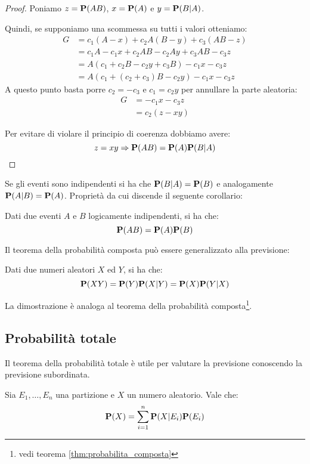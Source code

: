 \begin{proof}
  Poniamo \( z = \mathbf{P}(AB) \), \( x = \mathbf{P}(A) \) e \( y = \mathbf{P}(B|A) \).
  
  Quindi, se supponiamo una scommessa su tutti i valori otteniamo:
  \begin{align*}
    G &= c_1 (A - x) + c_2 A (B - y) + c_3 (AB - z) \\
    &= c_1A - c_1 x + c_2 AB - c_2 Ay + c_3 AB - c_3 z \\
    &= A(c_1 + c_2 B - c_2 y + c_3 B) - c_1 x - c_3 z \\
    &= A(c_1 + (c_2 + c_3)B - c_2 y) - c_1 x - c_3 z
  \end{align*}
  A questo punto basta porre \( c_2 = - c_3 \) e \( c_1 = c_2 y \) per annullare la parte aleatoria:
  \begin{align*}
    G &= - c_1 x - c_3 z \\
    &= c_2 (z - xy)
  \end{align*}

  Per evitare di violare il principio di coerenza dobbiamo avere:
  \[ z = xy \Rightarrow \mathbf{P}(AB) = \mathbf{P}(A) \mathbf{P}(B|A) \]
\end{proof}

Se gli eventi sono indipendenti si ha che \( \mathbf{P}(B|A) = \mathbf{P}(B) \) e analogamente \( \mathbf{P}(A|B) = \mathbf{P}(A) \). Proprietà da cui discende il seguente corollario:
\begin{corollary}
  Dati due eventi $A$ e $B$ logicamente indipendenti, si ha che:
  \[ \mathbf{P}(AB) = \mathbf{P}(A)\mathbf{P}(B) \]
\end{corollary}

Il teorema della probabilità composta può essere generalizzato alla previsione:
\begin{corollary}
  Dati due numeri aleatori $X$ ed $Y$, si ha che:
  \[ \mathbf{P}(XY) = \mathbf{P}(Y)\mathbf{P}(X|Y) = \mathbf{P}(X)\mathbf{P}(Y|X) \] %
\end{corollary}
La dimostrazione è analoga al teorema della probabilità composta\footnote{vedi teorema \ref{thm:probabilita_composta}}.

\subsection{Probabilità totale}
Il teorema della probabilità totale è utile per valutare la previsione conoscendo la previsione subordinata.

\begin{theorem}\label{thm:probabilita_totale}
  Sia \( E_1, \ldots, E_n \) una partizione e $X$ un numero aleatorio. Vale che:
  \[ \mathbf{P}(X) = \sum_{i = 1}^{n} \mathbf{P}(X|E_i)\mathbf{P}(E_i) \]
\end{theorem}

